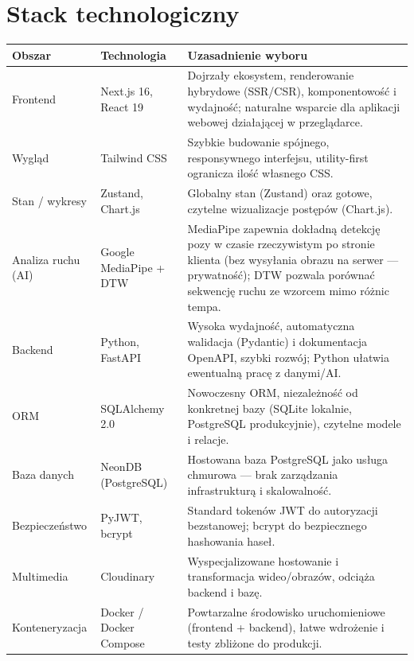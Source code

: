 \documentclass[11pt,a4paper]{article}
\begin{document}
\FloatBarrier
\section{Stack technologiczny}
\begin{longtable}{p{} p{} p{}}
\toprule
\textbf{Obszar} & \textbf{Technologia} & \textbf{Uzasadnienie wyboru} \\
\midrule
\endhead
Frontend & Next.js 16, React 19 & Dojrzały ekosystem, renderowanie hybrydowe (SSR/CSR), komponentowość i wydajność; naturalne wsparcie dla aplikacji webowej działającej w przeglądarce. \\
\addlinespace
Wygląd & Tailwind CSS & Szybkie budowanie spójnego, responsywnego interfejsu, utility-first ogranicza ilość własnego CSS. \\
\addlinespace
Stan / wykresy & Zustand, Chart.js & Globalny stan (Zustand) oraz gotowe, czytelne wizualizacje postępów (Chart.js). \\
\addlinespace
Analiza ruchu (AI) & Google MediaPipe + DTW & MediaPipe zapewnia dokładną detekcję pozy w czasie rzeczywistym po stronie klienta (bez wysyłania obrazu na serwer — prywatność); DTW pozwala porównać sekwencję ruchu ze wzorcem mimo różnic tempa. \\
\addlinespace
Backend & Python, FastAPI & Wysoka wydajność, automatyczna walidacja (Pydantic) i dokumentacja OpenAPI, szybki rozwój; Python ułatwia ewentualną pracę z danymi/AI. \\
\addlinespace
ORM & SQLAlchemy 2.0 & Nowoczesny ORM, niezależność od konkretnej bazy (SQLite lokalnie, PostgreSQL produkcyjnie), czytelne modele i relacje. \\
\addlinespace
Baza danych & NeonDB (PostgreSQL) & Hostowana baza PostgreSQL jako usługa chmurowa — brak zarządzania infrastrukturą i skalowalność. \\
\addlinespace
Bezpieczeństwo & PyJWT, bcrypt & Standard tokenów JWT do autoryzacji bezstanowej; bcrypt do bezpiecznego hashowania haseł. \\
\addlinespace
Multimedia & Cloudinary & Wyspecjalizowane hostowanie i transformacja wideo/obrazów, odciąża backend i bazę. \\
\addlinespace
Konteneryzacja & Docker / Docker Compose & Powtarzalne środowisko uruchomieniowe (frontend + backend), łatwe wdrożenie i testy zbliżone do produkcji. \\
\bottomrule
\end{longtable}
\end{document}
